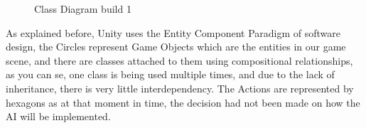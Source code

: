 \documentclass[12pt]{report}
\begin{document}
\begin{figure}[H]
    \centering
    \caption{Class Diagram build 1}
\end{figure}

As explained before, Unity uses the Entity Component Paradigm of software design, the Circles represent Game Objects which are the entities in our game scene, and there are classes attached to them using compositional relationships, as you can se, one class is being used multiple times, and due to the lack of inheritance, there is very little interdependency. 
The Actions are represented by hexagons as at that moment in time, the decision had not been made on how the AI will be implemented.

\end{document}
